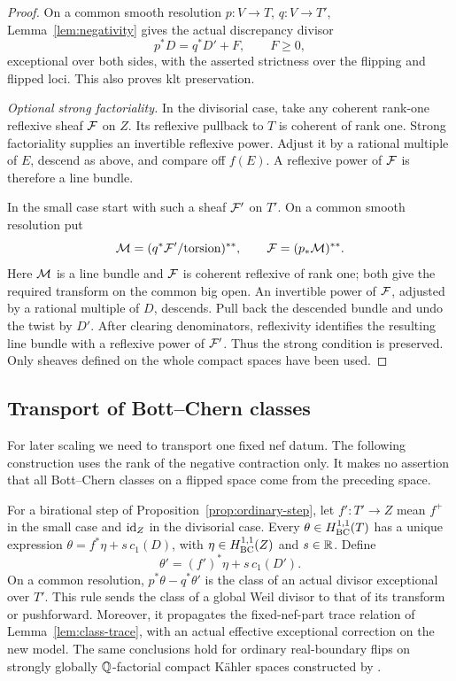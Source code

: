 \begin{proof}
On a common smooth resolution $p:V\to T$, $q:V\to T'$,
Lemma~\ref{lem:negativity} gives the actual discrepancy divisor
\begin{equation}\label{eq:ordinary-small-difference}
 p^*D=q^*D'+F,\qquad F\geq0,
\end{equation}
exceptional over both sides, with the asserted strictness over the
flipping and flipped loci.  This also proves klt preservation.

\smallskip\noindent
\emph{Optional strong factoriality.}
In the divisorial case, take any coherent rank-one reflexive sheaf
$\mathcal F$ on $Z$.  Its reflexive pullback to $T$ is coherent of rank one.
Strong factoriality supplies an invertible reflexive power.  Adjust it
by a rational multiple of $E$, descend as above, and compare off $f(E)$.
A reflexive power of $\mathcal F$ is therefore a line bundle.

In the small case start with such a sheaf $\mathcal F'$ on $T'$.  On a common
smooth resolution put
\[
 \mathcal M=(q^*\mathcal F'/\text{torsion})^{**},\qquad
 \mathcal F=(p_*\mathcal M)^{**}.
\]
Here $\mathcal M$ is a line bundle and $\mathcal F$ is coherent reflexive of rank one;
both give the required transform on the common big open.  An invertible
power of $\mathcal F$, adjusted by a rational multiple of $D$, descends.
Pull back the descended bundle and undo the twist by $D'$.  After
clearing denominators, reflexivity identifies the resulting line bundle
with a reflexive power of $\mathcal F'$.  Thus the strong condition is
preserved.  Only sheaves defined on the whole compact spaces have been
used.

\end{proof}

\subsection{Transport of Bott--Chern classes}

For later scaling we need to transport one fixed nef datum.  The following
construction uses the rank of the negative contraction only.  It makes
no assertion that all Bott--Chern classes on a flipped space come from
the preceding space.

\begin{lemma}\label{lem:class-transport}
For a birational step of Proposition~\ref{prop:ordinary-step}, let
$f':T'\to Z$ mean $f^+$ in the small case and $\mathrm{id}_Z$ in the divisorial
case.  Every $\theta\in H^{1,1}_{\mathrm{BC}}(T)$ has a unique expression
$\theta=f^*\eta+s\,c_1(D)$, with $\eta\in H^{1,1}_{\mathrm{BC}}(Z)$ and $s\in\mathbb R$.
Define
\begin{equation}\label{eq:class-transport}
 \theta'= (f')^*\eta+s\,c_1(D').
\end{equation}
On a common resolution, $p^*\theta-q^*\theta'$ is the class of an
actual divisor exceptional over $T'$.  This rule sends the class of a
global Weil divisor to that of its transform or pushforward.  Moreover,
it propagates the fixed-nef-part trace relation of
Lemma~\ref{lem:class-trace}, with an actual effective exceptional
correction on the new model.  The same conclusions hold for ordinary
real-boundary flips on strongly globally $\mathbb Q$-factorial compact K\"ahler
spaces constructed by \cite[Proposition~4.2]{HX2026}.
\end{lemma}

